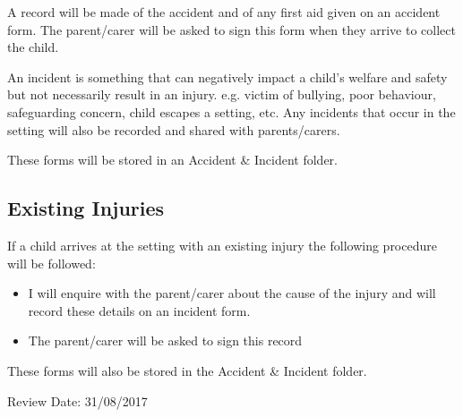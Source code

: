 A record will be made of the accident and of any first aid given on an
accident form. The parent/carer will be asked to sign this form when
they arrive to collect the child. 

An incident is something that can negatively impact a child's welfare and
safety but not necessarily result in an injury. e.g. victim of bullying, 
poor behaviour, safeguarding concern, child escapes a setting, etc.
Any incidents that occur in the setting will also be recorded and shared with
parents/carers.

These forms will be stored in an Accident \& Incident folder.

\subsection{Existing Injuries}

If a child arrives at the setting with an existing injury the following
procedure will be followed:

\begin{itemize}
\item
  I will enquire with the parent/carer about the cause of the injury
  and will record these details on an incident form.~
\item
  The parent/carer will be asked to sign this record~
\end{itemize}

These forms will also be stored in the Accident \& Incident folder.

Review Date: 31/08/2017


